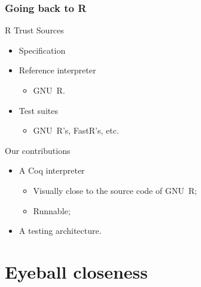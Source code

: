 \documentclass{beamer}
\newcommand{\cmark}{\ding{51}}
\newcommand{\xmark}{\ding{55}}
\begin{document}
\begin{frame}
    \frametitle{Going back to R}

    \begin{block}{R Trust Sources}
        \begin{changemargin}{0pt}{1cm}
    \begin{itemize}
        \item Specification \hfill \xmark
        \item Reference interpreter \hfill \cmark
           \begin{itemize}
               \item GNU~R.
           \end{itemize}
        \item Test suites \hfill \cmark
           \begin{itemize}
               \item GNU~R's, FastR's, etc.
           \end{itemize}
    \end{itemize}
        \end{changemargin}
    \end{block}

    \begin{block}{Our contributions}
        \begin{itemize}
            \item A Coq interpreter
                \begin{itemize}
                    \item Visually close to the source code of GNU~R;
                    \item Runnable;
                \end{itemize}
            \item A testing architecture.
        \end{itemize}
    \end{block}

\end{frame}

\section{Eyeball closeness}
\end{document}
